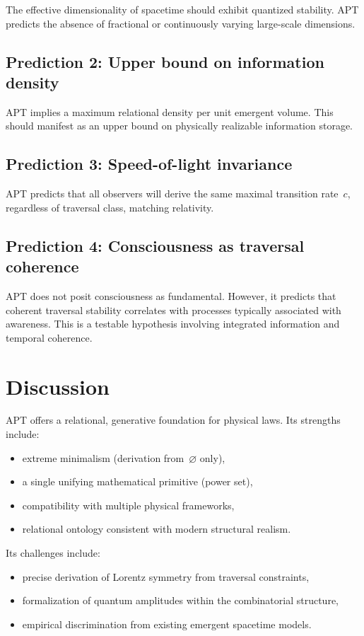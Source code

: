 \documentclass[12pt]{article}
\begin{document}
The effective dimensionality of spacetime should exhibit quantized 
stability.  
APT predicts the absence of fractional or continuously varying 
large-scale dimensions.

\subsection{Prediction 2: Upper bound on information density}

APT implies a maximum relational density per unit emergent volume.
This should manifest as an upper bound on physically realizable 
information storage.

\subsection{Prediction 3: Speed-of-light invariance}

APT predicts that all observers will derive the same maximal transition
rate~$c$, regardless of traversal class, matching relativity.

\subsection{Prediction 4: Consciousness as traversal coherence}

APT does not posit consciousness as fundamental.
However, it predicts that coherent traversal stability correlates with 
processes typically associated with awareness.
This is a testable hypothesis involving integrated information and 
temporal coherence.

\section{Discussion}

APT offers a relational, generative foundation for physical laws.
Its strengths include:
\begin{itemize}
    \item extreme minimalism (derivation from~$\varnothing$ only),
    \item a single unifying mathematical primitive (power set),
    \item compatibility with multiple physical frameworks,
    \item relational ontology consistent with modern structural realism.
\end{itemize}

Its challenges include:
\begin{itemize}
    \item precise derivation of Lorentz symmetry from traversal
    constraints,
    \item formalization of quantum amplitudes within the combinatorial
    structure,
    \item empirical discrimination from existing emergent spacetime
    models.
\end{itemize}
\end{document}
